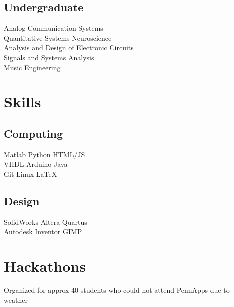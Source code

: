 \documentclass[]{deedy-resume-openfont}
\begin{document}
\begin{minipage}[t]{0.33\textwidth}
\subsection{Undergraduate}
Analog Communication Systems \\
Quantitative Systems Neuroscience \\
Analysis and Design of Electronic Circuits \\
Signals and Systems Analysis \\
Music Engineering
\sectionsep


\section{Skills}
\subsection{Computing}
Matlab \textbullet{} Python \textbullet{} HTML/JS \\
VHDL\textbullet{} Arduino \textbullet{} Java \\
Git \textbullet{} Linux \textbullet{} \LaTeX 
\sectionsep

\subsection{Design}
SolidWorks \textbullet{} Altera Quartus \\
Autodesk Inventor \textbullet{} GIMP


\section{Hackathons}



\vspace{\topsep} %
\begin{tightemize}
\item Organized for approx 40 students who could not attend PennApps due to weather
\end{tightemize}

\sectionsep




%
%

\end{minipage} 
\end{document}
